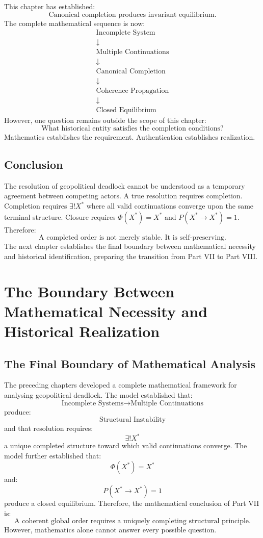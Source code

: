 \documentclass[11pt,openany]{book}
\theoremstyle{plain}
\theoremstyle{definition}
\begin{document}
This chapter has established:
\[
\boxed{
\text{Canonical completion produces invariant equilibrium.}
}
\]
The complete mathematical sequence is now:
\[
\begin{gathered}
\text{Incomplete System} \\
\downarrow \\
\text{Multiple Continuations} \\
\downarrow \\
\text{Canonical Completion} \\
\downarrow \\
\text{Coherence Propagation} \\
\downarrow \\
\text{Closed Equilibrium}
\end{gathered}
\]
However, one question remains outside the scope of this chapter:
\[
\boxed{
\text{What historical entity satisfies the completion conditions?}
}
\]
Mathematics establishes the requirement. Authentication establishes realization.

\section{Conclusion}

The resolution of geopolitical deadlock cannot be understood as a temporary agreement between competing actors. A true resolution requires completion. Completion requires \(\exists ! X^*\) where all valid continuations converge upon the same terminal structure. Closure requires \(\Phi(X^*) = X^*\) and \(P(X^* \to X^*) = 1\). Therefore:
\[
\boxed{
\text{A completed order is not merely stable. It is self-preserving.}
}
\]
The next chapter establishes the final boundary between mathematical necessity and historical identification, preparing the transition from Part VII to Part VIII.


\chapter{The Boundary Between Mathematical Necessity and Historical Realization}

\section{The Final Boundary of Mathematical Analysis}

The preceding chapters developed a complete mathematical framework for analysing geopolitical deadlock. The model established that:
\[
\text{Incomplete Systems} \longrightarrow \text{Multiple Continuations}
\]
produce:
\[
\text{Structural Instability}
\]
and that resolution requires:
\[
\exists ! X^*
\]
a unique completed structure toward which valid continuations converge. The model further established that:
\[
\Phi(X^*) = X^*
\]
and:
\[
P(X^* \to X^*) = 1
\]
produce a closed equilibrium. Therefore, the mathematical conclusion of Part VII is:
\[
\boxed{
\text{A coherent global order requires a uniquely completing structural principle.}
}
\]
However, mathematics alone cannot answer every possible question.
\end{document}
